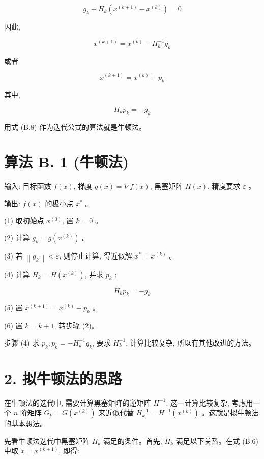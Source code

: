 \documentclass[10pt]{article}
\begin{document}
\begin{equation*}
g_{k}+H_{k}\left(x^{(k+1)}-x^{(k)}\right)=0 \tag{B.7}
\end{equation*}


因此,


\begin{equation*}
x^{(k+1)}=x^{(k)}-H_{k}^{-1} g_{k} \tag{B.8}
\end{equation*}


或者


\begin{equation*}
x^{(k+1)}=x^{(k)}+p_{k} \tag{B.9}
\end{equation*}


其中,


\begin{equation*}
H_{k} p_{k}=-g_{k} \tag{B.10}
\end{equation*}


用式 (B.8) 作为迭代公式的算法就是牛顿法。

\section*{算法 B. 1 (牛顿法)}
输入: 目标函数 $f(x)$, 梯度 $g(x)=\nabla f(x)$, 黑塞矩阵 $H(x)$, 精度要求 $\varepsilon$ 。

输出: $f(x)$ 的极小点 $x^{*}$ 。

(1) 取初始点 $x^{(0)}$, 置 $k=0$ 。

(2) 计算 $g_{k}=g\left(x^{(k)}\right)$ 。

(3) 若 $\left\|g_{k}\right\|<\varepsilon$, 则停止计算, 得近似解 $x^{*}=x^{(k)}$ 。

(4) 计算 $H_{k}=H\left(x^{(k)}\right)$, 并求 $p_{k}$ :

$$
H_{k} p_{k}=-g_{k}
$$

(5) 置 $x^{(k+1)}=x^{(k)}+p_{k}$ 。

(6) 置 $k=k+1$, 转步骤 (2)。

步骤 (4) 求 $p_{k}, p_{k}=-H_{k}^{-1} g_{k}$, 要求 $H_{k}^{-1}$, 计算比较复杂, 所以有其他改进的方法。

\section*{2. 拟牛顿法的思路}
在牛顿法的迭代中, 需要计算黑塞矩阵的逆矩阵 $H^{-1}$, 这一计算比较复杂, 考虑用一个 $n$ 阶矩阵 $G_{k}=G\left(x^{(k)}\right)$ 来近似代替 $H_{k}^{-1}=H^{-1}\left(x^{(k)}\right)$ 。这就是拟牛顿法的基本想法。

先看牛顿法迭代中黑塞矩阵 $H_{k}$ 满足的条件。首先, $H_{k}$ 满足以下关系。在式 (B.6) 中取 $x=x^{(k+1)}$, 即得:
\end{document}

